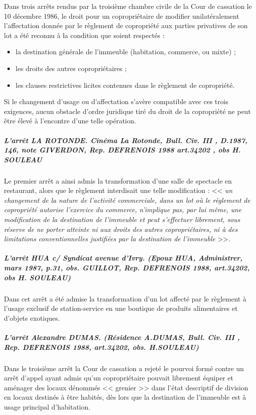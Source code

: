 				Dans trois arrêts rendus par la troisième chambre civile de la Cour de cassation le 10 décembre 1986, le droit pour un copropriétaire de modifier unilatéralement l'affectation donnée par le règlement de copropriété aux parties privatives de son lot a été reconnu à la condition que soient respectés :
				\begin{itemize}
					\item la destination générale de l'immeuble (habitation, commerce, ou mixte) ;
					\item les droits des autres copropriétaires ;
					\item les clauses restrictives licites contenues dans le règlement de copropriété.
				\end{itemize}
				
				Si le changement d'usage ou d'affectation s'avère compatible avec ces trois exigences, aucun obstacle d'ordre juridique tiré du droit de la copropriété ne peut être élevé à l'encontre d'une telle opération.
				
				\subparagraph{L'arrêt LA ROTONDE. Cinéma La Rotonde, Bull. Civ. III , D.1987, 146, note GIVERDON, Rep. DEFRENOIS 1988 art.34202 , obs H. SOULEAU}
				
				Le premier arrêt a ainsi admis la transformation d'une salle de spectacle en restaurant, alors que le règlement interdisait une telle modification : << {\itshape un changement de la nature de l'activité commerciale, dans un lot où le règlement de copropriété autorise l'exercice du commerce, n'implique pas, par lui même, une modification de la destination de l'immeuble et peut s'effectuer librement, sous réserve de ne porter atteinte ni aux droits des autres copropriétaires, ni à des limitations conventionnelles justifiées par la destination de l'immeuble }>>.
				
				\subparagraph{L'arrêt HUA c/ Syndicat avenue d'Ivry. (Epoux HUA, Administrer, mars 1987, p.31, obs. GUILLOT, Rep. DEFRENOIS 1988, art.34202, obs H. SOULEAU)}
				
				Dans cet arrêt a été admise la transformation d'un lot affecté par le règlement à l'usage exclusif de station-service en une boutique de produits alimentaires et d'objets exotiques.
				
				\subparagraph{L'arrêt Alexandre DUMAS. (Résidence A.DUMAS, Bull. Civ. III , Rep. DEFRENOIS 1988, art.34202, obs. H.SOULEAU)}
				
				Dans le troisième arrêt la Cour de cassation a rejeté le pourvoi formé contre un arrêt d'appel ayant admis qu'un copropriétaire pouvait librement équiper et aménager des locaux dénommés << grenier >> dans l'état descriptif de division en locaux destinés à être habités, dès lors que la destination de l'immeuble est à usage principal d'habitation.
			
